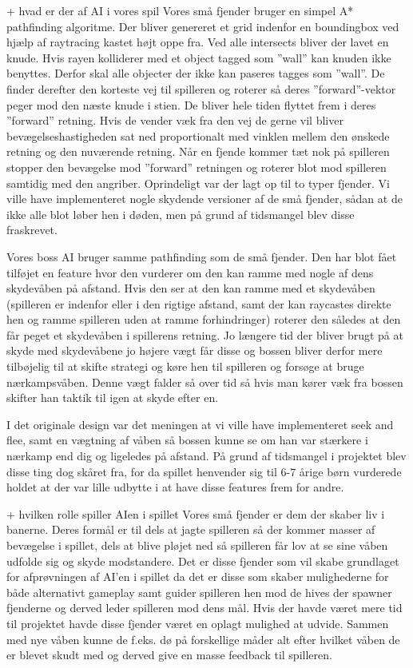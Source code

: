                 + hvad er der af AI i vores spil Vores små fjender
bruger en simpel A* pathfinding algoritme. Der bliver genereret et
grid indenfor en boundingbox ved hjælp af raytracing kastet højt oppe
fra. Ved alle intersects bliver der lavet en knude. Hvis rayen
kolliderer med et object tagged som ''wall'' kan knuden ikke
benyttes. Derfor skal alle objecter der ikke kan paseres tagges som
''wall''.  De finder derefter den korteste vej til spilleren og
roterer så deres ''forward''-vektor peger mod den næste knude i
stien. De bliver hele tiden flyttet frem i deres ''forward''
retning. Hvis de vender væk fra den vej de gerne vil bliver
bevægelseshastigheden sat ned proportionalt med vinklen mellem den
ønskede retning og den nuværende retning.  Når en fjende kommer tæt
nok på spilleren stopper den bevægelse mod ''forward'' retningen og
roterer blot mod spilleren samtidig med den angriber.  Oprindeligt var
der lagt op til to typer fjender. Vi ville have implementeret nogle
skydende versioner af de små fjender, sådan at de ikke alle blot løber
hen i døden, men på grund af tidsmangel blev disse fraskrevet.

Vores boss AI bruger samme pathfinding som de små fjender. Den har
blot fået tilføjet en feature hvor den vurderer om den kan ramme med
nogle af dens skydevåben på afstand. Hvis den ser at den kan ramme med
et skydevåben (spilleren er indenfor eller i den rigtige afstand, samt
der kan raycastes direkte hen og ramme spilleren uden at ramme
forhindringer) roterer den således at den får peget et skydevåben i
spillerens retning. Jo længere tid der bliver brugt på at skyde med
skydevåbene jo højere vægt får disse og bossen bliver derfor mere
tilbøjelig til at skifte strategi og køre hen til spilleren og forsøge
at bruge nærkampsvåben. Denne vægt falder så over tid så hvis man
kører væk fra bossen skifter han taktik til igen at skyde efter en.

I det originale design var det meningen at vi ville have implementeret
seek and flee, samt en vægtning af våben så bossen kunne se om han var
stærkere i nærkamp end dig og ligeledes på afstand. På grund af
tidsmangel i projektet blev disse ting dog skåret fra, for da spillet
henvender sig til 6-7 årige børn vurderede holdet at der var lille
udbytte i at have disse features frem for andre.


                + hvilken rolle spiller AIen i spillet Vores små
fjender er dem der skaber liv i banerne. Deres formål er til dels at
jagte spilleren så der kommer masser af bevægelse i spillet, dels at
blive pløjet ned så spilleren får lov at se sine våben udfolde sig og
skyde modstandere. Det er disse fjender som vil skabe grundlaget for
afprøvningen af AI'en i spillet da det er disse som skaber
mulighederne for både alternativt gameplay samt guider spilleren hen
mod de hives der spawner fjenderne og derved leder spilleren mod dens
mål. Hvis der havde været mere tid til projektet havde disse fjender
været en oplagt mulighed at udvide. Sammen med nye våben kunne de
f.eks. dø på forskellige måder alt efter hvilket våben de er blevet
skudt med og derved give en masse feedback til spilleren.

